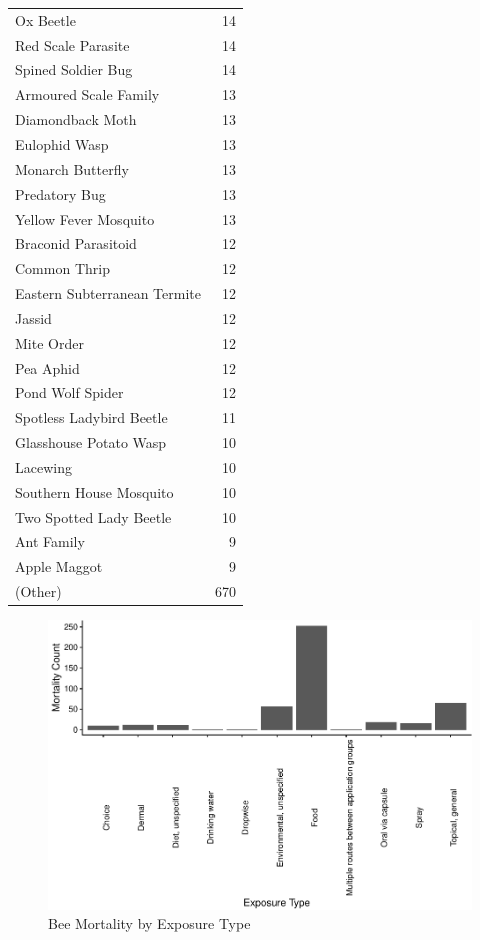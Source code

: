 \documentclass[
  12pt,
]{article}
\begin{document}
\begin{longtable}[]{@{}lr@{}}
Ox Beetle & 14 \\
Red Scale Parasite & 14 \\
Spined Soldier Bug & 14 \\
Armoured Scale Family & 13 \\
Diamondback Moth & 13 \\
Eulophid Wasp & 13 \\
Monarch Butterfly & 13 \\
Predatory Bug & 13 \\
Yellow Fever Mosquito & 13 \\
Braconid Parasitoid & 12 \\
Common Thrip & 12 \\
Eastern Subterranean Termite & 12 \\
Jassid & 12 \\
Mite Order & 12 \\
Pea Aphid & 12 \\
Pond Wolf Spider & 12 \\
Spotless Ladybird Beetle & 11 \\
Glasshouse Potato Wasp & 10 \\
Lacewing & 10 \\
Southern House Mosquito & 10 \\
Two Spotted Lady Beetle & 10 \\
Ant Family & 9 \\
Apple Maggot & 9 \\
(Other) & 670 \\
\bottomrule
\end{longtable}

\begin{figure}
\centering
\includegraphics{SamEdit_UpdatedwithModel_files/figure-latex/unnamed-chunk-7-1.pdf}
\caption{Bee Mortality by Exposure Type}
\end{figure}
\end{document}
